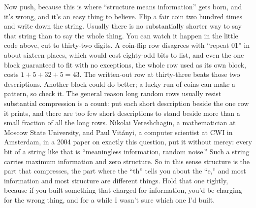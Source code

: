 \documentclass[11pt,twoside]{article}
\theoremstyle{thielethm}
\theoremstyle{thieledef}
\theoremstyle{thieledef}
\theoremstyle{thieledef}
\theoremstyle{thielethm}
\theoremstyle{thieleobs}
\theoremstyle{thielethm}
\begin{document}
Now push, because this is where ``structure means information'' gets born, and it's wrong, and it's an easy thing to believe. Flip a fair coin two hundred times and write down the string. Usually there is no substantially shorter way to say that string than to say the whole thing. You can watch it happen in the little code above, cut to thirty-two digits. A coin-flip row disagrees with ``repeat 01'' in about sixteen places, which would cost eighty-odd bits to list, and even the one block guaranteed to fit with no exceptions, the whole row used as its own block, costs $1 + 5 + 32 + 5 = 43$. The written-out row at thirty-three beats those two descriptions. Another block could do better; a lucky run of coins can make a pattern, so check it. The general reason long random rows usually resist substantial compression is a count: put each short description beside the one row it prints, and there are too few short descriptions to stand beside more than a small fraction of all the long rows. Nikolai Vereshchagin, a mathematician at Moscow State University, and Paul Vitányi, a computer scientist at CWI in Amsterdam, in a 2004 paper on exactly this question, put it without mercy: every bit of a string like that is ``meaningless information, random noise.'' Such a string carries maximum information and zero structure. So in this sense structure is the part that compresses, the part where the ``th'' tells you about the ``e,'' and most information and most structure are different things. Hold that one tightly, because if you built something that charged for information, you'd be charging for the wrong thing, and for a while I wasn't sure which one I'd built.
\end{document}
